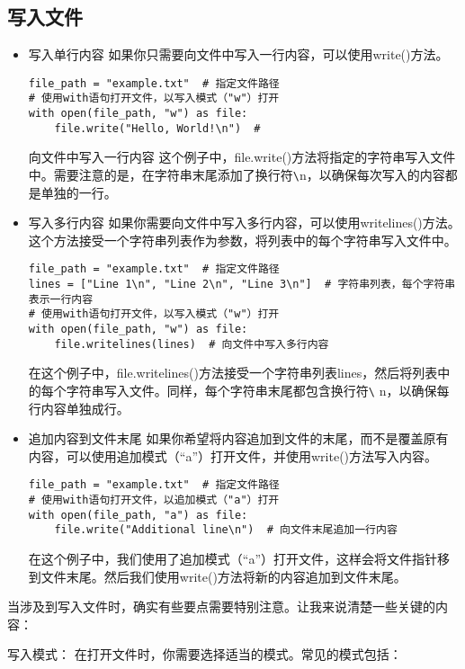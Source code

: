 \documentclass{article}
\begin{document}
\subsection{写入文件}
\begin{itemize}
 \item 写入单行内容
如果你只需要向文件中写入一行内容，可以使用write()方法。
\begin{lstlisting}[caption={示例Python代码}]
file_path = "example.txt"  # 指定文件路径
# 使用with语句打开文件，以写入模式（"w"）打开
with open(file_path, "w") as file:
    file.write("Hello, World!\n")  #
\end{lstlisting}
    
 向文件中写入一行内容
这个例子中，file.write()方法将指定的字符串写入文件中。需要注意的是，在字符串末尾添加了换行符\verb|\|n，以确保每次写入的内容都是单独的一行。
\item 写入多行内容
如果你需要向文件中写入多行内容，可以使用writelines()方法。这个方法接受一个字符串列表作为参数，将列表中的每个字符串写入文件中。
\begin{lstlisting}[caption={示例Python代码}]
file_path = "example.txt"  # 指定文件路径
lines = ["Line 1\n", "Line 2\n", "Line 3\n"]  # 字符串列表，每个字符串表示一行内容
# 使用with语句打开文件，以写入模式（"w"）打开
with open(file_path, "w") as file:
    file.writelines(lines)  # 向文件中写入多行内容
\end{lstlisting}
    

在这个例子中，file.writelines()方法接受一个字符串列表lines，然后将列表中的每个字符串写入文件。同样，每个字符串末尾都包含换行符\verb|\| n，以确保每行内容单独成行。
\item 追加内容到文件末尾
如果你希望将内容追加到文件的末尾，而不是覆盖原有内容，可以使用追加模式（“a”）打开文件，并使用write()方法写入内容。
\begin{lstlisting}[caption={示例Python代码}]
file_path = "example.txt"  # 指定文件路径
# 使用with语句打开文件，以追加模式（"a"）打开
with open(file_path, "a") as file:
    file.write("Additional line\n")  # 向文件末尾追加一行内容
\end{lstlisting}
在这个例子中，我们使用了追加模式（“a”）打开文件，这样会将文件指针移到文件末尾。然后我们使用write()方法将新的内容追加到文件末尾。
\end{itemize}

当涉及到写入文件时，确实有些要点需要特别注意。让我来说清楚一些关键的内容：

写入模式： 在打开文件时，你需要选择适当的模式。常见的模式包括：
\end{document}
